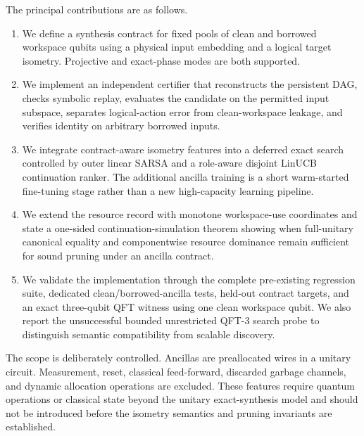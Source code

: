 The principal contributions are as follows.
\begin{enumerate}
\item We define a synthesis contract for fixed pools of clean and borrowed workspace qubits using a physical input embedding and a logical target isometry. Projective and exact-phase modes are both supported.
\item We implement an independent certifier that reconstructs the persistent DAG, checks symbolic replay, evaluates the candidate on the permitted input subspace, separates logical-action error from clean-workspace leakage, and verifies identity on arbitrary borrowed inputs.
\item We integrate contract-aware isometry features into a deferred exact search controlled by outer linear SARSA and a role-aware disjoint LinUCB continuation ranker. The additional ancilla training is a short warm-started fine-tuning stage rather than a new high-capacity learning pipeline.
\item We extend the resource record with monotone workspace-use coordinates and state a one-sided continuation-simulation theorem showing when full-unitary canonical equality and componentwise resource dominance remain sufficient for sound pruning under an ancilla contract.
\item We validate the implementation through the complete pre-existing regression suite, dedicated clean/borrowed-ancilla tests, held-out contract targets, and an exact three-qubit QFT witness using one clean workspace qubit. We also report the unsuccessful bounded unrestricted QFT-3 search probe to distinguish semantic compatibility from scalable discovery.
\end{enumerate}

The scope is deliberately controlled. Ancillas are preallocated wires in a unitary circuit. Measurement, reset, classical feed-forward, discarded garbage channels, and dynamic allocation operations are excluded. These features require quantum operations or classical state beyond the unitary exact-synthesis model and should not be introduced before the isometry semantics and pruning invariants are established.
